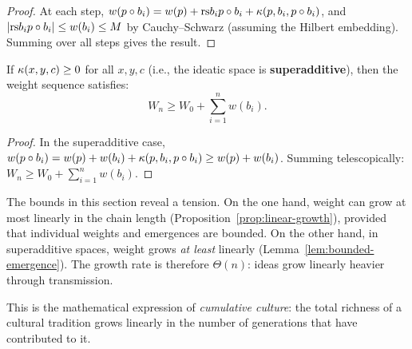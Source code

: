 \begin{proof}
At each step,
$w(p \circ b_i) = w(p) + \mathrm{rs}{b_i}{p \circ b_i}
  + \kappa(p, b_i, p \circ b_i)$,
and $|\mathrm{rs}{b_i}{p \circ b_i}| \leq w(b_i) \leq M$ by Cauchy--Schwarz
(assuming the Hilbert embedding).  Summing over all steps gives the result.
\end{proof}

\begin{lemma}
\label{lem:bounded-emergence}
If $\kappa(x, y, c) \geq 0$ for all $x, y, c$ (i.e., the ideatic space is
\textbf{superadditive}), then the weight sequence satisfies:
\[
  W_n \geq W_0 + \sum_{i=1}^{n} w(b_i).
\]
\end{lemma}

\begin{proof}
In the superadditive case,
$w(p \circ b_i) = w(p) + w(b_i) + \kappa(p, b_i, p \circ b_i) \geq w(p) + w(b_i)$.
Summing telescopically: $W_n \geq W_0 + \sum_{i=1}^n w(b_i)$.
\end{proof}

\begin{interpretation}
The bounds in this section reveal a tension.  On the one hand, weight can grow
at most linearly in the chain length (Proposition~\ref{prop:linear-growth}),
provided that individual weights and emergences are bounded.  On the other
hand, in superadditive spaces, weight grows \emph{at least} linearly
(Lemma~\ref{lem:bounded-emergence}).  The growth rate is therefore
$\Theta(n)$: ideas grow linearly heavier through transmission.

This is the mathematical expression of \emph{cumulative culture}: the total
richness of a cultural tradition grows linearly in the number of generations
that have contributed to it.
\end{interpretation}

